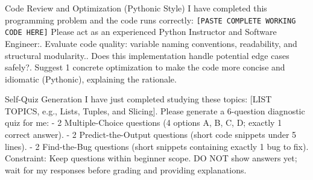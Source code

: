 \documentclass[11pt,a4paper]{article}
\begin{document}
\begin{promptbox}{Code Review and Optimization (Pythonic Style)}
\small
I have completed this programming problem and the code runs correctly:\newline
\texttt{[PASTE COMPLETE WORKING CODE HERE]}\newline
Please act as an experienced Python Instructor and Software Engineer:. Evaluate code quality: variable naming conventions, readability, and structural modularity.. Does this implementation handle potential edge cases safely?. Suggest 1 concrete optimization to make the code more concise and idiomatic (Pythonic), explaining the rationale.
\end{promptbox}

\begin{promptbox}{Self-Quiz Generation}
\small
I have just completed studying these topics: [LIST TOPICS, e.g., Lists, Tuples, and Slicing].\newline
Please generate a 6-question diagnostic quiz for me:\newline
- 2 Multiple-Choice questions (4 options A, B, C, D; exactly 1 correct answer).\newline
- 2 Predict-the-Output questions (short code snippets under 5 lines).\newline
- 2 Find-the-Bug questions (short snippets containing exactly 1 bug to fix).\newline
Constraint: Keep questions within beginner scope. DO NOT show answers yet; wait for my responses before grading and providing explanations.
\end{promptbox}
\end{document}

